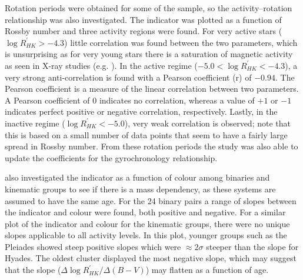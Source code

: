 Rotation periods were obtained for some of the \citet{Mamajek_Hillenbrand_2008} sample, so the activity--rotation relationship was also investigated. The \Rprime indicator was plotted as a function of Rossby number  and three activity regions were found. For very active stars ($\log R^{'}_{HK} > -4.3$) little correlation was found between the two parameters, which is unsurprising as for very young stars there is a saturation of magnetic activity as seen in X-ray studies (e.g. \citealt{Jackson_etal_2012}). In the active regime ($-5.0 < \log R^{'}_{HK} < -4.3$), a very strong anti-correlation is found with a Pearson coefficient (r) of $-0.94$. The Pearson coefficient is a measure of the linear correlation between two parameters. A Pearson coefficient of $0$ indicates no correlation, whereas a value of $+1$ or $-1$ indicates perfect positive or negative correlation, respectively. Lastly, in the inactive regime ($\log R^{'}_{HK} < -5.0$), very weak correlation is observed; note that this is based on a small number of data points that seem to have a fairly large spread in Rossby number. From these rotation periods the study was also able to update the coefficients for the \citet{Barnes_2007} gyrochronology relationship.

\citet{Mamajek_Hillenbrand_2008} also investigated the \Rprime indicator as a function of colour among binaries and kinematic groups to see if there is a mass dependency, as these systems are assumed to have the same age. For the 24 binary pairs a range of slopes between the \Rprime indicator and colour were found, both positive and negative. For a similar plot of the \Rprime indicator and colour for the kinematic groups, there were no unique slopes applicable to all activity levels. In this plot, younger groups such as the Pleiades showed steep positive slopes which were $\approx 2\sigma$ steeper than the slope for Hyades. The oldest cluster displayed the most negative slope, which may suggest that the slope ($\Delta\log R^{'}_{HK} / \Delta(B- V)$) may flatten as a function of age.

